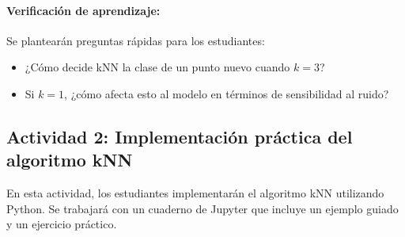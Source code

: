\documentclass[a4,11pt]{aleph-notas}
\begin{document}
\paragraph{Verificación de aprendizaje:}  
Se plantearán preguntas rápidas para los estudiantes:
\begin{itemize}[leftmargin=*]
    \item ¿Cómo decide kNN la clase de un punto nuevo cuando $k=3$?
    \item Si $k=1$, ¿cómo afecta esto al modelo en términos de sensibilidad al ruido?
\end{itemize}

\subsection*{Actividad 2: Implementación práctica del algoritmo kNN}

En esta actividad, los estudiantes implementarán el algoritmo kNN utilizando Python. Se trabajará con un cuaderno de Jupyter que incluye un ejemplo guiado y un ejercicio práctico.
\end{document}

